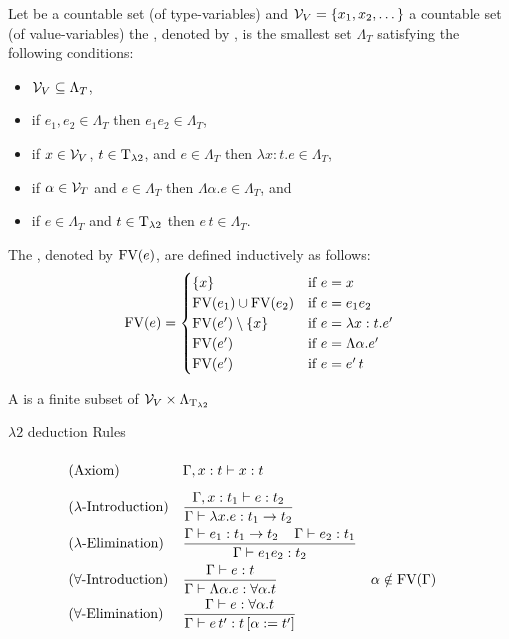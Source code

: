 \begin{definition}
Let \lambdaTypVar{} be a countable set (of type-variables) and $\mathcal{V}_V=\{x_1,x_2,\dots\}$ a countable set (of value-variables) the , denoted by \lambdaTerms{}, is the smallest set $\Lambda_T$ satisfying the following conditions: %
\begin{itemize}
\item $\mathcal{V}_V\subseteq\Lambda_T$,
\item if $e_1,e_2\in\Lambda_T$ then $e_1e_2\in\Lambda_T$,
\item if $x\in\mathcal{V}_V$, $t\in\text{T}_{\lambda2}$, and $e\in\Lambda_T$ then $\lambda x:t.e\in\Lambda_T$,
\item if $\alpha\in\mathcal{V}_T$ and $e\in\Lambda_T$ then $\Lambda \alpha.e\in\Lambda_T$, and
\item if $e\in\Lambda_T$ and $t\in\text{T}_{\lambda2}$ then $e\,t\in\Lambda_T$.
\end{itemize}
\end{definition}
\begin{definition}
The , denoted by $\text{FV}(e)$, are defined inductively as follows:
\[\FV(e)=
\begin{cases}
\{x\} & \text{if $e=x$}\\ %
\FV(e_1)\cup\FV(e_2) & \text{if $e=e_1e_2$}\\
\FV(e')\setminus\{x\} & \text{if $e=\lambda x:t.e'$}\\
\FV(e') & \text{if $e=\Lambda\alpha.e'$}\\
\FV(e') & \text{if $e=e'\,t$}\\
\end{cases}\]
\end{definition}
\begin{definition} 
A  is a finite subset of $\mathcal{V}_V\times\Lambda_{\text{T}_{\lambda2}}$ %
\end{definition}
$\lambda2$ deduction Rules
\begin{mdframed} 
\begingroup
\addtolength{\jot}{0.3cm}
\begin{align*}
&(\text{Axiom}) &&\Gamma,x:t\vdash x:t\vphantom{\frac{t_1}{t_1}}\\
&(\lambda\text{-Introduction}) &&\frac{\Gamma,x:t_1\vdash e:t_2}{\Gamma\vdash \lambda x.e:t_1\to t_2}\\
&(\lambda\text{-Elimination}) &&\frac{\Gamma\vdash e_1:t_1\to t_2 \hspace{0.4cm}\Gamma\vdash e_2:t_1}{\Gamma\vdash e_1e_2:t_2}\\
&(\forall\text{-Introduction}) &&\frac{\Gamma\vdash e:t}{\Gamma\vdash \Lambda\alpha.e:\forall\alpha.t} &&\alpha\notin\FV(\Gamma) \\
&(\forall\text{-Elimination}) &&\frac{\Gamma\vdash e:\forall\alpha.t }{\Gamma\vdash e\,t':t\left[ \alpha:=t'\right] }
\end{align*}
\endgroup
\end{mdframed}

